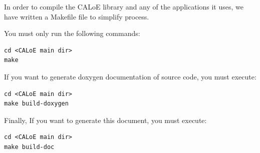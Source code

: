 In order to compile the CALoE library and any of the applications it uses, we have written a Makefile file to simplify process.

You must only run the following commands:

\lstset{language=Bash}

\begin{lstlisting}[frame=single, label=make_caloe, caption=Compiling CALoE library\, devices and tools]
cd <CALoE main dir>
make
\end{lstlisting}

If you want to generate doxygen documentation of source code, you must execute:

\begin{lstlisting}[frame=single, label=make_doxygen, caption=Compiling CALoE library doxygen documentation]
cd <CALoE main dir>
make build-doxygen
\end{lstlisting}

Finally, If you want to generate this document, you must execute:

\begin{lstlisting}[frame=single, label=make_doc, caption=Compiling CALoE library documentation]
cd <CALoE main dir>
make build-doc
\end{lstlisting}
